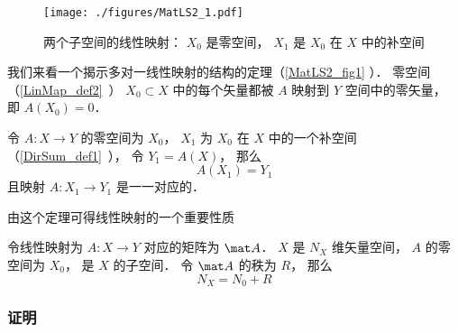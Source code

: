 

\begin{figure}[ht]
\centering
\texttt{[image: ./figures/MatLS2\_1.pdf]}
\caption{两个子空间的线性映射： $X_0$ 是零空间， $X_1$ 是 $X_0$ 在 $X$ 中的补空间} \label{MatLS2_fig1}
\end{figure}
我们来看一个揭示多对一线性映射的结构的定理（\autoref{MatLS2_fig1} ）． 零空间（\autoref{LinMap_def2}~） $X_0 \subset X$ 中的每个矢量都被 $A$ 映射到 $Y$ 空间中的零矢量， 即 $A(X_0) = \qty{0}$．
\begin{theorem}{}
令 $A:X \to Y$ 的零空间为 $X_0$， $X_1$ 为 $X_0$ 在 $X$ 中的一个补空间（\autoref{DirSum_def1}~）， 令 $Y_1 = A(X)$， 那么
\begin{equation}
A(X_1) = Y_1
\end{equation}
且映射 $A:X_1\to Y_1$ 是一一对应的．
\end{theorem}
由这个定理可得线性映射的一个重要性质
\begin{corollary}{}
令线性映射为 $A:X\to Y$ 对应的矩阵为 $\mat A$． $X$ 是 $N_X$ 维矢量空间， $A$ 的零空间为 $X_0$， 是 $X$ 的子空间． 令 $\mat A$ 的秩为 $R$， 那么
\begin{equation}
N_X = N_0 + R
\end{equation}
\end{corollary}


\subsubsection{证明}
